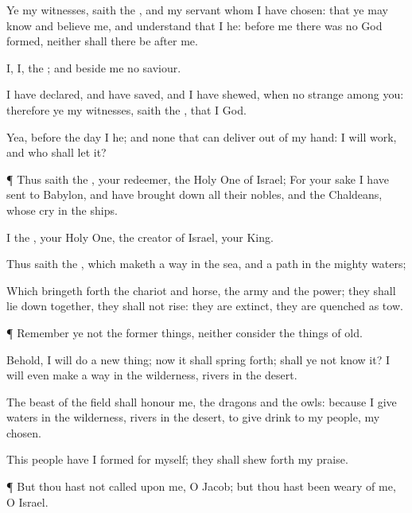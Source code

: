 {Ye
{} my
witnesses,
saith the
{}, and my
servant whom I have
chosen: that ye may
know and
believe me, and
understand that I
{} he:
before me there was no
God
formed, neither shall there be
after me.

I,
{} I,
{} the
{}; and
beside me
{} no
saviour.

I have
declared, and have
saved, and I have
shewed, when
{} no
strange
{} among you: therefore ye
{} my
witnesses,
saith the
{}, that I
{}
God.

Yea, before the
day
{} I
{} he; and
{} none that can
deliver out of my
hand: I will
work, and who shall
let it?


\par }{\PP {}¶ Thus
saith the
{}, your
redeemer, the Holy
One of
Israel; For your sake I have
sent to
Babylon, and have brought
down all their
nobles, and the
Chaldeans, whose
cry
{} in the
ships.

I
{} the
{}, your Holy
One, the
creator of
Israel, your
King.

Thus
saith the
{}, which
maketh a
way in the
sea, and a
path in the
mighty
waters;

Which bringeth
forth the
chariot and
horse, the
army and the
power; they shall lie
down
together, they shall not
rise: they are
extinct, they are
quenched as
tow.


\par }{\PP {}¶
Remember ye not the former
things, neither
consider the things of
old.

Behold, I will
do a new
thing; now it shall spring
forth; shall ye not
know it? I will even
make a
way in the
wilderness,
{}
rivers in the
desert.

The
beast of the
field shall
honour me, the
dragons and the
owls: because I
give
waters in the
wilderness,
{}
rivers in the
desert, to give
drink to my
people, my
chosen.

This
people have I
formed for myself; they shall shew
forth my
praise.


\par }{\PP {}¶ But thou hast not
called upon me, O
Jacob; but thou hast been
weary of me, O
Israel.

}

